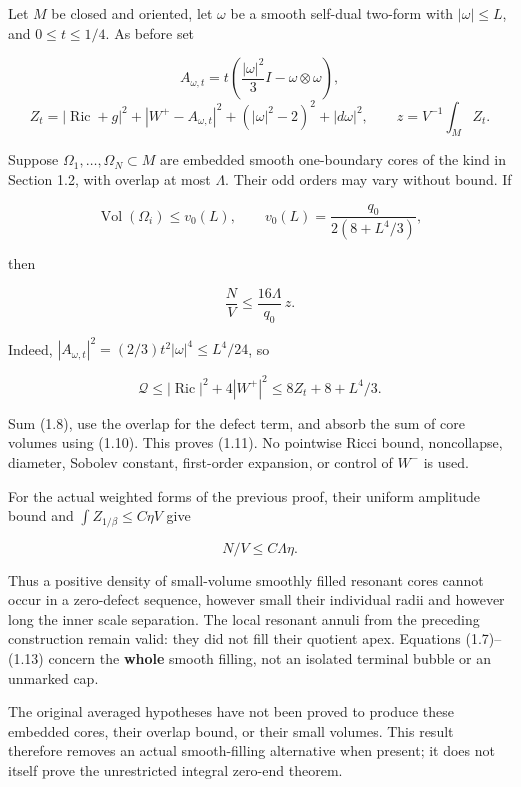 \documentclass[
  10pt,
]{article}
\begin{document}
Let \(M\) be closed and oriented, let \(\omega\) be a smooth self-dual
two-form with \(|\omega|\le L\), and \(0\le t\le1/4\). As before set

\[
 A_{\omega,t}=t\left(\frac{|\omega|^2}{3}I-\omega\otimes\omega\right),
\] \[
 Z_t=|\operatorname{Ric}+g|^2+|W^+-A_{\omega,t}|^2
                         +( |\omega|^2-2)^2+|d\omega|^2,
 \qquad z=V^{-1}\int_M Z_t.                         \tag{1.9}
\]

Suppose \(\Omega_1,\ldots,\Omega_N\subset M\) are embedded smooth
one-boundary cores of the kind in Section 1.2, with overlap at most
\(\Lambda\). Their odd orders may vary without bound. If

\[
 \operatorname{Vol}(\Omega_i)\le v_0(L),\qquad
 v_0(L)=\frac{q_0}{2(8+L^4/3)},
                                                        \tag{1.10}
\]

then

\[
                    \boxed{\frac NV\le\frac{16\Lambda}{q_0}\,z.}
                                                        \tag{1.11}
\]

Indeed, \(|A_{\omega,t}|^2=(2/3)t^2|\omega|^4\le L^4/24\), so

\[
 \mathscr Q\le |\operatorname{Ric}|^2+4|W^+|^2
          \le8Z_t+8+L^4/3.                         \tag{1.12}
\]

Sum (1.8), use the overlap for the defect term, and absorb the sum of
core volumes using (1.10). This proves (1.11). No pointwise Ricci bound,
noncollapse, diameter, Sobolev constant, first-order expansion, or
control of \(W^-\) is used.

For the actual weighted forms of the previous proof, their uniform
amplitude bound and \(\int Z_{1/\beta}\le C\eta V\) give

\[
                         N/V\le C\Lambda\eta.       \tag{1.13}
\]

Thus a positive density of small-volume smoothly filled resonant cores
cannot occur in a zero-defect sequence, however small their individual
radii and however long the inner scale separation. The local resonant
annuli from the preceding construction remain valid: they did not fill
their quotient apex. Equations (1.7)--(1.13) concern the \textbf{whole}
smooth filling, not an isolated terminal bubble or an unmarked cap.

The original averaged hypotheses have not been proved to produce these
embedded cores, their overlap bound, or their small volumes. This result
therefore removes an actual smooth-filling alternative when present; it
does not itself prove the unrestricted integral zero-end theorem.
\end{document}
